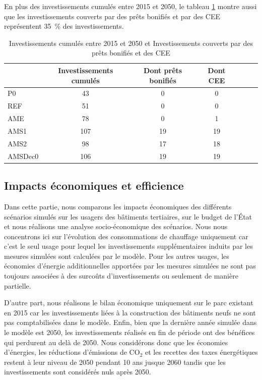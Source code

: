 \documentclass[10.5pt,a4paper]{article}
\begin{document}
{En plus des investissements cumulés entre 2015 et 2050, le tableau \ref{Cumul_INV} montre aussi que les investissements couverts par des prêts bonifiés et par des CEE représentent 35~\% des investissements. 


\begin{table}[h] \caption{Investissements cumulés entre 2015 et 2050 et Investissements couverts par des prêts bonifiés et des CEE}\label{Cumul_INV}
\centering
\scriptsize
\begin{tabular}[c]{|l|c|c|c|c|c|c|}
\hline
				& Investissements cumulés & Dont prêts bonifiés & Dont CEE 	\\
\hline
P0 			&	43	&					0	 &										0	\\
REF 		&	51 	&					0  &										0 \\			
AME 		&	78 	&					0  &										1 \\					
AMS1 		&	107 &					19 &										19	\\				
AMS2 		&	98 	&					17 &			  						18 \\		
AMSDec0 &	106 & 				19 &										19	\\	
\hline
\end{tabular}
\end{table}

\clearpage

\subsection{Impacts économiques et efficience}

Dans cette partie, nous comparons les impacts économiques des différents scénarios simulés sur les usagers des bâtiments tertiaires, sur le budget de l’État et nous réalisons une analyse socio-économique des scénarios. Nous nous concentrons ici sur l'évolution des consommations de chauffage uniquement car c'est le seul usage pour lequel les investissements supplémentaires induits par les mesures simulées sont calculées par le modèle. Pour les autres usages, les économies d'énergie additionnelles apportées par les mesures simulées ne sont pas toujours associées à des surcoûts d'investissements ou seulement de manière partielle. 

D'autre part, nous réalisons le bilan économique uniquement sur le parc existant en 2015 car les investissements liées à la construction des bâtiments neufs ne sont pas comptabilisées dans le modèle. Enfin, bien que la dernière année simulée dans le modèle est 2050, les investissements réalisés en fin de période ont des bénéfices qui perdurent au delà de 2050. Nous considérons donc que les économies d'énergies, les réductions d'émissions de CO$_2$ et les recettes des taxes énergétiques restent à leur niveau de 2050 pendant 10 ans jusque 2060 tandis que les investissements sont considérés nuls après 2050. 

}
\end{document}
